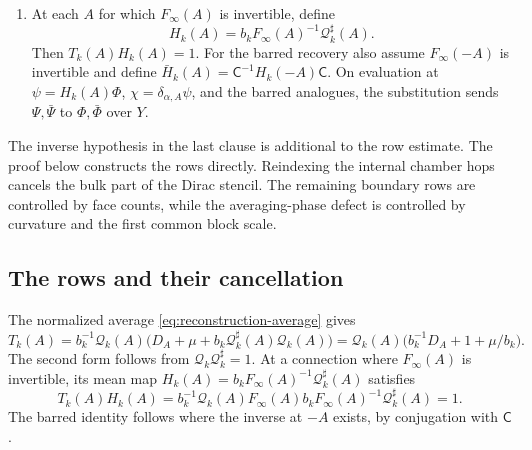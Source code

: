 \begin{theorem}
\begin{enumerate}[label=\textup{(\roman*)},leftmargin=*]
\item At each \(A\) for which \(F_\infty(A)\) is invertible,
define
\[
 H_k(A)=b_kF_\infty(A)^{-1}\mathcal Q_k^\sharp(A).
\]
Then \(T_k(A)H_k(A)=1\).
For the barred recovery also assume \(F_\infty(-A)\) is
invertible and define
\(\bar H_k(A)=\mathsf C^{-1}H_k(-A)\mathsf C\).
On evaluation at \(\psi=H_k(A)\Phi\),
\(\chi=\delta_{\alpha,A}\psi\), and the barred analogues,
the substitution sends \(\Psi,\bar\Psi\) to \(\Phi,\bar\Phi\)
over \(Y\).
\end{enumerate}
\end{theorem}

The inverse hypothesis in the last clause is additional to the
row estimate. The proof below constructs the rows directly.
Reindexing the internal chamber hops cancels the bulk part of
the Dirac stencil. The remaining boundary rows are controlled by
face counts, while the averaging-phase defect is controlled by
curvature and the first common block scale.

\subsection{The rows and their cancellation}
The normalized average \eqref{eq:reconstruction-average} gives
\begin{equation}\label{eq:rg-reconstruction-definition}
 T_k(A)=b_k^{-1}\mathcal Q_k(A)
            \big(D_A+\mu+b_k\mathcal Q_k^\sharp(A)\mathcal Q_k(A)\big)
       =\mathcal Q_k(A)\big(b_k^{-1}D_A+1+\mu/b_k\big).
\end{equation}
The second form follows from
$\mathcal Q_k\mathcal Q_k^\sharp=1$.
At a connection where $F_\infty(A)$ is invertible, its mean map
$H_k(A)=b_kF_\infty(A)^{-1}\mathcal Q_k^\sharp(A)$ satisfies
\begin{equation}\label{eq:rg-reconstruction-left-inverse}
 T_k(A)H_k(A)
 =b_k^{-1}\mathcal Q_k(A)F_\infty(A)
               b_kF_\infty(A)^{-1}\mathcal Q_k^\sharp(A)=1.
\end{equation}
The barred identity follows where the inverse at $-A$ exists,
by conjugation with $\mathsf C$.

